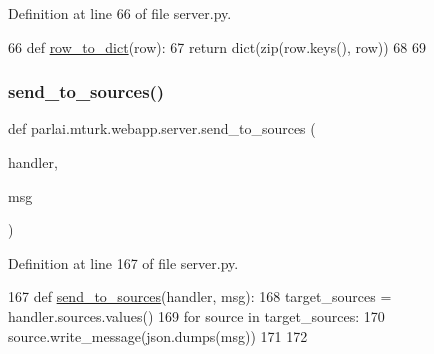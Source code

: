 Definition at line 66 of file server.\+py.


\begin{DoxyCode}
66 \textcolor{keyword}{def }\hyperlink{namespaceparlai_1_1mturk_1_1webapp_1_1server_a92be47964fa33a4b6a14d4069d091c7d}{row\_to\_dict}(row):
67     \textcolor{keywordflow}{return} dict(zip(row.keys(), row))
68 
69 
\end{DoxyCode}
\mbox{\label{namespaceparlai_1_1mturk_1_1webapp_1_1server_a12f6bdadae00003ac87686d5fd7a26df}} 
\subsubsection{\texorpdfstring{send\+\_\+to\+\_\+sources()}{send\_to\_sources()}}
{\footnotesize\ttfamily def parlai.\+mturk.\+webapp.\+server.\+send\+\_\+to\+\_\+sources (\begin{DoxyParamCaption}\item[{}]{handler,  }\item[{}]{msg }\end{DoxyParamCaption})}



Definition at line 167 of file server.\+py.


\begin{DoxyCode}
167 \textcolor{keyword}{def }\hyperlink{namespaceparlai_1_1mturk_1_1webapp_1_1server_a12f6bdadae00003ac87686d5fd7a26df}{send\_to\_sources}(handler, msg):
168     target\_sources = handler.sources.values()
169     \textcolor{keywordflow}{for} source \textcolor{keywordflow}{in} target\_sources:
170         source.write\_message(json.dumps(msg))
171 
172 
\end{DoxyCode}
\mbox{\label{namespaceparlai_1_1mturk_1_1webapp_1_1server_a3faf7a84baf92a6b0863ab87a0015c41}} 
